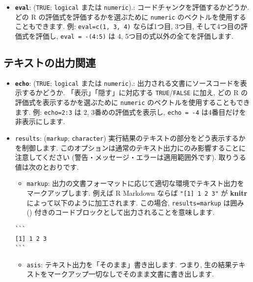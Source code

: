\documentclass[
  11pt,
  lualatex,ja=standard,jafont=noto]{bxjsreport}
\providecommand{\tightlist}{%
  \setlength{\itemsep}{0pt}\setlength{\parskip}{0pt}}
\begin{document}
\begin{itemize}
\tightlist
\item
  \textbf{\texttt{eval}}: (\texttt{TRUE}; \texttt{logical} または \texttt{numeric}).: コードチャンクを評価するかどうか. どの R の評価式を評価するかを選ぶために \texttt{numeric} のベクトルを使用することもできます. 例: \texttt{eval=c(1, 3, 4)} ならば1つ目, 3つ目, そして4つ目の評価式を評価し, \texttt{eval = -(4:5)} は 4, 5つ目の式以外の全てを評価します.
\end{itemize}

\hypertarget{text-output}{%
\subsection{テキストの出力関連}\label{text-output}}

\begin{itemize}
\tightlist
\item
  \textbf{\texttt{echo}}: (\texttt{TRUE}; \texttt{logical} または \texttt{numeric}).: 出力される文書にソースコードを表示するかどうか. 「表示」「隠す」に対応する \texttt{TRUE}/\texttt{FALSE} に加え, どの R の評価式を表示するかを選ぶために \texttt{numeric} のベクトルを使用することもできます. 例: \texttt{echo=2:3} は 2, 3番めの評価式を表示し, \texttt{echo = -4} は4番目だけを非表示にします.
\item
  \texttt{results}: (\texttt{\textquotesingle{}markup\textquotesingle{}}; \texttt{character}) 実行結果のテキストの部分をどう表示するかを制御します. このオプションは通常のテキスト出力にのみ影響することに注意してください (警告・メッセージ・エラーは適用範囲外です). 取りうる値は次のとおりです.

  \begin{itemize}
  \tightlist
  \item
    \texttt{markup}: 出力の文書フォーマットに応じて適切な環境でテキスト出力をマークアップします. 例えば R Markdown ならば \texttt{"{[}1{]}\ 1\ 2\ 3"} が \textbf{knitr} によって以下のように加工されます. この場合, \texttt{results=\textquotesingle{}markup\textquotesingle{}} は囲み (\texttt{\textasciigrave{}\textasciigrave{}\textasciigrave{}}) 付きのコードブロックとして出力されることを意味します.
  \end{itemize}

\begin{verbatim}
```
[1] 1 2 3
```
\end{verbatim}

  \begin{itemize}
  \tightlist
  \item
    \texttt{asis}: テキスト出力を「そのまま」書き出します. つまり, 生の結果テキストをマークアップ一切なしでそのまま文書に書き出します.
  \end{itemize}


\end{itemize}
\end{document}
